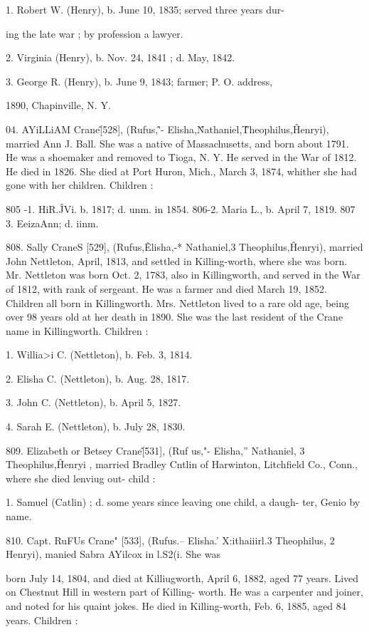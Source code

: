 1. Robert W. (Henry), b. June 10, 1835; served three years dur- 

ing the late war ; by profession a lawyer. 

2. Virginia (Henry), b. Nov. 24, 1841 ; d. May, 1842. 

3. George R. (Henry), b. June 9, 1843; farmer; P. O. address, 

1890, Chapinville, N. Y. 

04. AYiLLiAM Crane\^ [528], (Rufus,\^'- Elisha,\^ Nathaniel,\^ 
Theophilus,\^ Henryi), married Ann J. Ball. She was a native 
of Massachusetts, and born about 1791. He was a shoemaker 
and removed to Tioga, N. Y. He served in the War of 1812. 
He died in 1826. She died at Port Huron, Mich., March 3, 
1874, whither she had gone with her children. Children : 

805 -1. HiR.\^JVi. b. 1817; d. unm. in 1854. 
806-2. Maria L., b. April 7, 1819. 
807  3. EeizaAnn; d. iinm. 

808. Sally CraneS [529], (Rufus,\^ Elisha,-* Nathaniel,3 
Theophilus,\^ Henryi), married John Nettleton, April, 1813, and 
settled in Killing-worth, where she was born. Mr. Nettleton was 
born Oct. 2, 1783, also in Killingworth, and served in the War 
of 1812, with rank of sergeant. He was a farmer and died 
March 19, 1852. Children all born in Killingworth. Mrs. 
Nettleton lived to a rare old age, being over 98 years old at her 
death in 1890. She was the last resident of the Crane name in 
Killingworth. Children : 

1. Willia>i C. (Nettleton), b. Feb. 3, 1814. 

2. Elisha C. (Nettleton), b. Aug. 28, 1817. 

3. John C. (Nettleton), b. April 5, 1827. 

4. Sarah E. (Nettleton), b. July 28, 1830. 

809. Elizabeth or Betsey Crane\^ [531], (Ruf us,"- Elisha,'' 
Nathaniel, 3 Theophilus,\^ Henryi , married Bradley Cntlin of 
Harwinton, Litchfield Co., Conn., where she died lenviug out- 
child : 

1. Samuel (Catlin) ; d. some years since leaving one child, a daugh- 
ter, Genio by name. 

810. Capt. RuFUs Crane" [533], (Rufus.-- Elisha.' X:ithaiiirl.3 
Theophilus, 2 Henryi), manied Sabra AYilcox in l.S2(i. She was 




born July 14, 1804, and died at Killiugworth, April 6, 1882, 
aged 77 years. Lived on Chestnut Hill in western part of Killing- 
worth. He was a carpenter and joiner, and noted for his quaint 
jokes. He died in Killing-worth, Feb. 6, 1885, aged 84 years. 
Children : 

